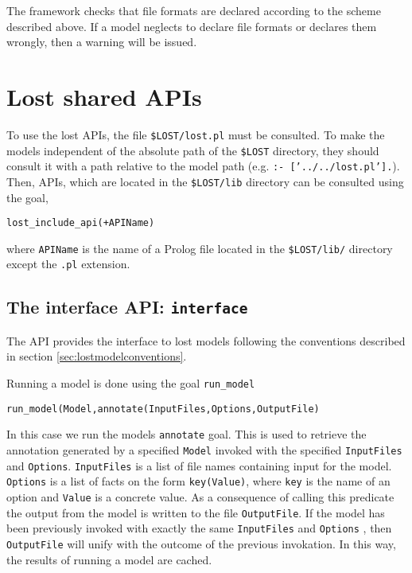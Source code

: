 \documentclass{book}
\begin{document}
The framework checks that file formats are declared according to the 
scheme described above. If a model neglects to declare file formats or
declares them wrongly, then a warning will be issued.

\chapter{Lost shared APIs}
\label{chap:lostsharedapis}

To use the lost APIs, the file \texttt{\$LOST/lost.pl} must be consulted. To make the models
independent of the absolute path of the \texttt{\$LOST} directory, they should consult it with
a path relative to the model path (e.g. \texttt{:- ['../../lost.pl'].}).
 Then,
APIs, which are located in the \texttt{\$LOST/lib} directory
can be consulted using the goal, 
\begin{verbatim}
lost_include_api(+APIName)
\end{verbatim}

\noindent
where \texttt{APIName} is the name of a Prolog file located
in the \texttt{\$LOST/lib/} directory except the \texttt{.pl}
extension.

\section{The interface API: \texttt{interface}}

The API provides the interface to lost models following the
conventions described in section \ref{sec:lostmodelconventions}.

Running a model is done using the goal \texttt{run\_model}
\begin{verbatim}
run_model(Model,annotate(InputFiles,Options,OutputFile)
\end{verbatim}


In this case we run the models \texttt{annotate} goal. 
This is used to retrieve the annotation generated by a specified
\texttt{Model} invoked with the specified \texttt{InputFiles} and
\texttt{Options}. \texttt{InputFiles} is a list of file names containing 
input for the model. \texttt{Options} is a list of facts on the form
\texttt{key(Value)}, where \texttt{key} is the name of an
option and \texttt{Value} is a concrete value.
As a consequence of calling this predicate the output from the model is written to the file
\texttt{OutputFile}. If the model has been previously invoked with exactly
the same \texttt{InputFiles} and \texttt{Options} , then
\texttt{OutputFile} will unify with the outcome of the previous
invokation. In this way, the results of running a model are cached.
\end{document}

